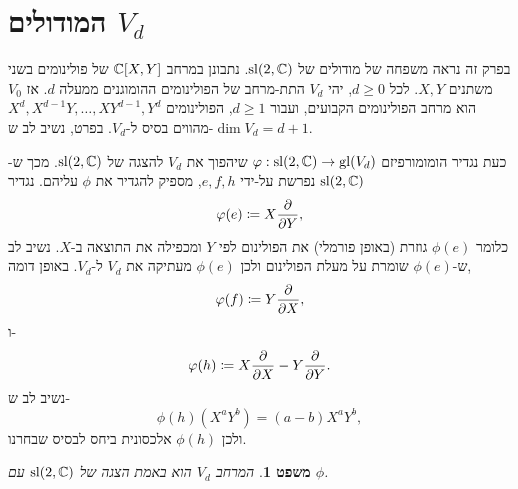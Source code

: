 \documentclass{report}
\theoremstyle{break}
\newtheorem{theorem}{משפט}[chapter]
\theoremstyle{MyNonumberbreak}
\begin{document}
\section{המודולים $V_d$}
בפרק זה נראה משפחה של מודולים של $\operatorname{sl}(2, \operatorname{\mathbb{C}})$. נתבונן במרחב $\operatorname{\mathbb{C}}[X, Y]$ של פולינומים בשני משתנים $X, Y$. לכל $d \ge 0$, יהי $V_d$ התת-מרחב של הפולינומים ההומוגנים ממעלה $d$. אז $V_0$ הוא מרחב הפולינומים הקבועים, ועבור $d \ge 1$, הפולינומים $X^d, X^{d-1}Y, \ldots, XY^{d-1}, Y^d$ מהווים בסיס ל-$V_d$. בפרט, נשיב לב ש-$\dim V_d = d+1$.

כעת נגדיר הומומורפיזם $\varphi : \operatorname{sl}(2, \operatorname{\mathbb{C}}) \to \operatorname{gl}(V_d)$ שיהפוך את $V_d$ להצגה של $\operatorname{sl}(2, \operatorname{\mathbb{C}})$. מכך ש-$\operatorname{sl}(2, \operatorname{\mathbb{C}})$ נפרשת על-ידי $e, f, h$, מספיק להגדיר את $\phi$ עליהם. נגדיר
\[ \phi(e) \coloneqq X \diffp{}{Y}, \]
כלומר $\phi(e)$ גוזרת (באופן פורמלי) את הפולינום לפי $Y$ ומכפילה את התוצאה ב-$X$. נשיב לב ש-$\phi(e)$ שומרת על מעלת הפולינום ולכן $\phi(e)$ מעתיקה את $V_d$ ל-$V_d$. באופן דומה,
\[ \phi(f) \coloneqq Y \diffp{}{X}, \]
ו-
\[ \phi(h) \coloneqq X \diffp{}{X} - Y \diffp{}{Y}. \]
נשיב לב ש-
\[ \phi(h)(X^aY^b) = (a - b)X^aY^b, \]
ולכן $\phi(h)$ אלכסונית ביחס לבסיס שבחרנו.
\begin{theorem}
	המרחב $V_d$ הוא באמת הצגה של $\operatorname{sl}(2, \operatorname{\mathbb{C}})$ עם $\phi$.
\end{theorem}
\end{document}
